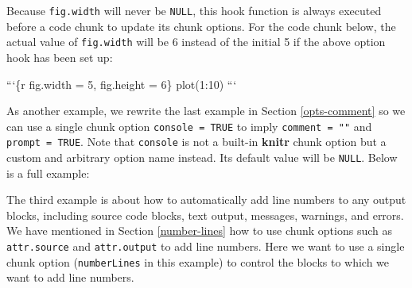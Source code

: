 \documentclass[
  11pt,
]{krantz}
\newenvironment{Shaded}{\begin{snugshade}}{\end{snugshade}}
\newcommand{\BaseNTok}[1]{\textcolor[rgb]{0.06,0.06,0.06}{#1}}
\newcommand{\NormalTok}[1]{#1}
\begin{document}
Because \texttt{fig.width} will never be \texttt{NULL}, this hook function is always executed before a code chunk to update its chunk options. For the code chunk below, the actual value of \texttt{fig.width} will be 6 instead of the initial 5 if the above option hook has been set up:

\begin{Shaded}
\begin{Highlighting}[]
\BaseNTok{```\{r fig.width = 5, fig.height = 6\}}
\BaseNTok{plot(1:10)}
\BaseNTok{```}
\end{Highlighting}
\end{Shaded}

As another example, we rewrite the last example in Section \ref{opts-comment} so we can use a single chunk option \texttt{console\ =\ TRUE} to imply \texttt{comment\ =\ ""} and \texttt{prompt\ =\ TRUE}. Note that \texttt{console} is not a built-in \textbf{knitr} chunk option but a custom and arbitrary option name instead. Its default value will be \texttt{NULL}. Below is a full example:

\begin{Shaded}
\end{Shaded}

The third example is about how to automatically add line numbers to any output blocks, including source code blocks, text output, messages, warnings, and errors. We have mentioned in Section \ref{number-lines} how to use chunk options such as \texttt{attr.source} and \texttt{attr.output} to add line numbers. Here we want to use a single chunk option (\texttt{numberLines} in this example) to control the blocks to which we want to add line numbers.
\end{document}
